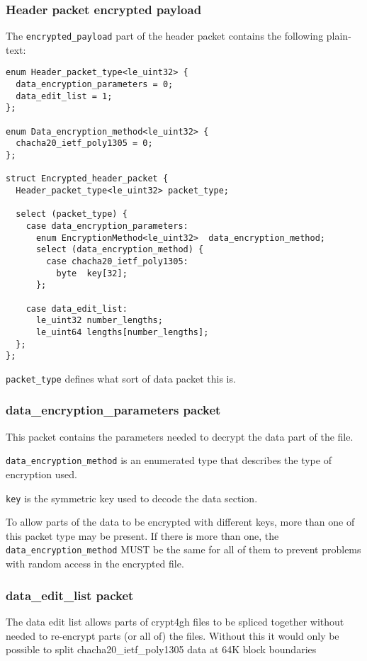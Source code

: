 \documentclass[10pt]{article}
\newcommand{\kw}[1]{\texttt{#1}}
\begin{document}
\subsubsection{Header packet encrypted payload}

The \kw{encrypted\_payload} part of the header packet contains the following plain-text:

\begin{verbatim}
enum Header_packet_type<le_uint32> {
  data_encryption_parameters = 0;
  data_edit_list = 1;
};

enum Data_encryption_method<le_uint32> {
  chacha20_ietf_poly1305 = 0;
};

struct Encrypted_header_packet {
  Header_packet_type<le_uint32> packet_type;

  select (packet_type) {
    case data_encryption_parameters:
      enum EncryptionMethod<le_uint32>  data_encryption_method;
      select (data_encryption_method) {
        case chacha20_ietf_poly1305:
          byte  key[32];
      };

    case data_edit_list:
      le_uint32 number_lengths;
      le_uint64 lengths[number_lengths];
  };
};
\end{verbatim}

\kw{packet\_type} defines what sort of data packet this is.

\subsubsection{data\_encryption\_parameters packet}

This packet contains the parameters needed to decrypt the data part of the file.

\kw{data\_encryption\_method} is an enumerated type that describes the type of encryption used.

\kw{key} is the symmetric key used to decode the data section.

To allow parts of the data to be encrypted with different keys, more than one of this packet type may be present.
If there is more than one, the \kw{data\_encryption\_method} MUST be the same for all of them to prevent problems
with random access in the encrypted file.

\subsubsection{data\_edit\_list packet}

The data edit list allows parts of crypt4gh files to be spliced together without needed to re-encrypt parts (or all of)
the files.
Without this it would only be possible to split chacha20\_ietf\_poly1305 data at 64K block boundaries
\end{document}
